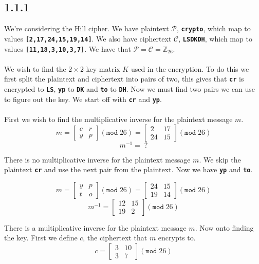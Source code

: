 \documentclass[11pt]{report}
\begin{document}
\subsection*{1.1.1}
We're considering the Hill cipher. We have plaintext $\mathcal{P}$, {\tt\bfseries crypto}, which map to values {\tt\bfseries [2,17,24,15,19,14]}. We also have ciphertext $\mathcal{C}$, {\tt\bfseries LSDKDH}, which map to values {\tt\bfseries [11,18,3,10,3,7]}. We have that $\mathcal{P} = \mathcal{C} = \mathbb{Z}_{26}$.
\\
\\
We wish to find the $2 \times 2$ key matrix $K$ used in the encryption. To do this we first split the plaintext and ciphertext into pairs of two, this gives that {\tt\bfseries cr} is encrypted to {\tt\bfseries LS}, {\tt\bfseries yp} to {\tt\bfseries DK} and {\tt\bfseries to} to {\tt\bfseries DH}. Now we must find two pairs we can use to figure out the key. We start off with {\tt\bfseries cr} and {\tt\bfseries yp}.\\
\\
First we wish to find the multiplicative inverse for the plaintext message $m$.
$$m = \begin{bmatrix}
       c & r\\
       y & p
	\end{bmatrix} (\mathtt{mod}\;26) = \begin{bmatrix}
       2 & 17\\
       24 & 15
	\end{bmatrix} (\mathtt{mod}\;26)$$
$$m^{-1} =\;?$$

There is no multiplicative inverse for the plaintext message $m$. We skip the plaintext {\tt\bfseries cr} and use the next pair from the plaintext. Now we have {\tt\bfseries yp} and {\tt\bfseries to}.

$$m = \begin{bmatrix}
       	y & p\\
     	t & o
	\end{bmatrix} (\mathtt{mod}\;26) = \begin{bmatrix}
		24 & 15\\
		19 & 14
	\end{bmatrix} (\mathtt{mod}\;26)$$
$$m^{-1} = \begin{bmatrix}
		12 & 15\\
		19 & 2
	\end{bmatrix} (\mathtt{mod}\;26)$$

There is a multiplicative inverse for the plaintext message $m$. Now onto finding the key. First we define $c$, the ciphertext that $m$ encrypts to.
$$c = \begin{bmatrix}
		3 & 10\\
		3 & 7
	\end{bmatrix} (\mathtt{mod}\;26)$$
	
\end{document}
